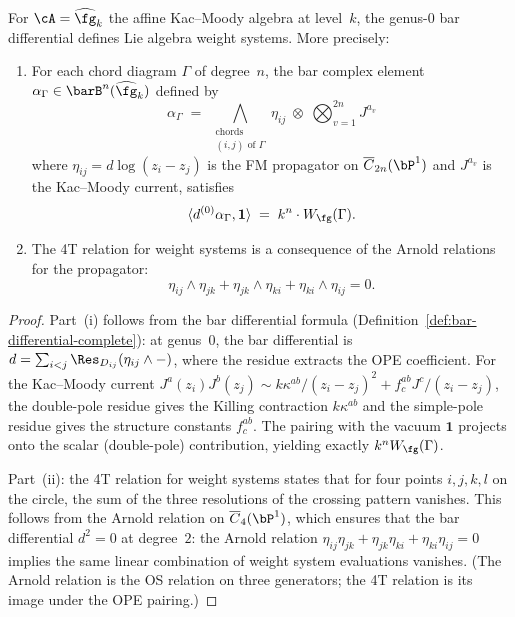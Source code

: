 \begin{theorem}
\label{thm:bar-weight-systems}
For $\cA = \widehat{\fg}_k$ the affine Kac--Moody algebra at
level~$k$, the genus-$0$ bar differential defines Lie algebra
weight systems. More precisely:
\begin{enumerate}[label=\textup{(\roman*)}]
\item For each chord diagram $\Gamma$ of degree~$n$, the bar
 complex element
 $\alpha_\Gamma \in \barB^n(\widehat{\fg}_k)$
 defined by
 \[
 \alpha_\Gamma \;=\;
 \bigwedge_{\substack{\text{chords}\\(i,j) \text{ of } \Gamma}}
 \eta_{ij}
 \;\otimes\;
 \bigotimes_{v=1}^{2n} J^{a_v}
 \]
 where $\eta_{ij} = d\log(z_i - z_j)$ is the FM propagator on
 $\overline{C}_{2n}(\bP^1)$ and $J^{a_v}$ is the Kac--Moody
 current, satisfies
 \[
 \langle d^{(0)} \alpha_\Gamma, \mathbf{1} \rangle
 \;=\;
 k^n \cdot W_\fg(\Gamma).
 \]
\item The 4T relation for weight systems is a consequence of the
 Arnold relations for the propagator:
 \[
 \eta_{ij} \wedge \eta_{jk}
 + \eta_{jk} \wedge \eta_{ki}
 + \eta_{ki} \wedge \eta_{ij} = 0.
 \]
\end{enumerate}
\end{theorem}

\begin{proof}
Part~(i) follows from the bar differential formula
(Definition~\ref{def:bar-differential-complete}): at genus~$0$, the
bar differential is $d = \sum_{i<j} \Res_{D_{ij}}(\eta_{ij}
\wedge -)$, where the residue extracts the OPE coefficient. For
the Kac--Moody current $J^a(z_i) J^b(z_j)
\sim k\kappa^{ab}/(z_i-z_j)^2 + f^{ab}_c J^c/(z_i-z_j)$, the
double-pole residue gives the Killing contraction $k\kappa^{ab}$
and the simple-pole residue gives the structure constants
$f^{ab}_c$. The pairing with the vacuum $\mathbf{1}$ projects onto
the scalar (double-pole) contribution, yielding exactly
$k^n W_\fg(\Gamma)$.

Part~(ii): the 4T relation for weight systems states that for four
points $i,j,k,l$ on the circle, the sum of the three resolutions of
the crossing pattern vanishes. This follows from the Arnold
relation on $\overline{C}_4(\bP^1)$, which ensures that the bar
differential $d^2 = 0$ at degree~$2$: the Arnold relation
$\eta_{ij}\eta_{jk} + \eta_{jk}\eta_{ki}
+ \eta_{ki}\eta_{ij} = 0$ implies the same linear combination
of weight system evaluations vanishes. (The Arnold relation is
the OS relation on three generators; the 4T relation is its
image under the OPE pairing.)
\end{proof}

